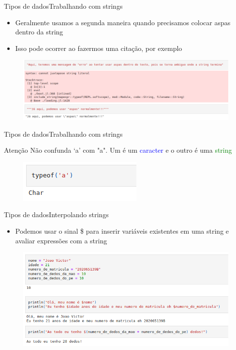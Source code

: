 \documentclass{beamer}
\begin{document}
\begin{frame}{Tipos de dados}{Trabalhando com strings}
    \begin{itemize}
        \item Geralmente usamos a segunda maneira quando precisamos colocar aspas dentro da string
        \item Isso pode ocorrer ao fazermos uma citação, por exemplo
    \end{itemize}
    \begin{figure}
        \centering
        \includegraphics[scale=0.35]{imagens/string02.png}
        \label{fig:my_label}
    \end{figure}
\end{frame}

\begin{frame}{Tipos de dados}{Trabalhando com strings}
    \begin{block}{Atenção}
        Não confunda `a' com "a". Um é um \textcolor{blue}{caracter} e o outro é uma \textcolor{green}{string}
    \end{block}
    \begin{figure}
        \centering
        \includegraphics[scale=0.5]{imagens/char.png}
        \label{fig:my_label}
    \end{figure}
\end{frame}

\begin{frame}{Tipos de dados}{Interpolando strings}
    \begin{itemize}
        \item Podemos usar o sinal \$ para inserir variáveis existentes em uma string e avaliar expressões com a string
    \end{itemize}
    \begin{figure}
        \centering
        \includegraphics[scale=0.4]{imagens/string03.png}
        \label{fig:my_label}
    \end{figure}
\end{frame}
\end{document}
